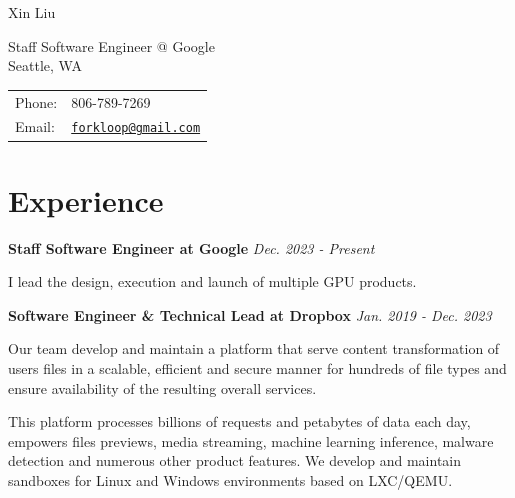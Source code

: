 \documentclass[letterpaper, 10pt]{article}
\def\name{Xin Liu}
\renewenvironment{itemize}{
  \begin{list}{}{
    \setlength{\leftmargin}{1.5em}
  }
}{
  \end{list}
}
\begin{document}
{\huge \name}

\vspace{0.25in}
\begin{minipage}{0.65\textwidth}
Staff Software Engineer @ Google \\
Seattle, WA \\
\end{minipage}
\begin{minipage}{0.45\textwidth}\vspace{-0.1in}
\begin{tabular}{ll}
Phone: &806-789-7269 \\
Email: &\href{mailto:forkloop@gmail.com}{\tt forkloop@gmail.com} \\\end{tabular}
\end{minipage}


\section*{Experience}
\begin{itemize}
	\item \textbf{Staff Software Engineer at Google}
	\hspace{2.6in} \textit{Dec. 2023 - Present}
	\begin{itemize}
		\item{I lead the design, execution and launch of multiple GPU products.}
	\end{itemize}
\end{itemize}

\begin{itemize}
\item \textbf{Software Engineer \& Technical Lead at Dropbox}
\hspace{2in} \textit{Jan. 2019 - Dec. 2023}
\begin{itemize}
	\item{Our team develop and maintain a platform that serve content transformation of users files in a scalable,
		efficient and secure manner for hundreds of file types and ensure availability of the resulting overall
		services.}

	\item{This platform processes billions of requests and petabytes of data each day, empowers files previews,
		media streaming, machine learning inference, malware detection and numerous other product features.
		We develop and maintain sandboxes for Linux and Windows environments based on LXC/QEMU.}
\end{itemize}
\end{itemize}
\end{document}
